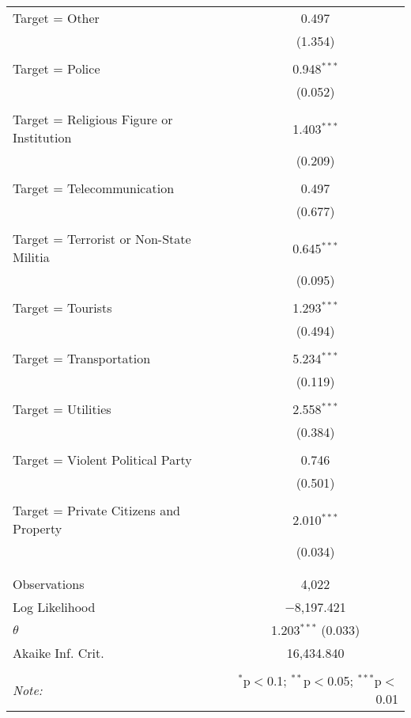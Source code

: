 \begin{table}[!htbp]
\begin{tabular}{@{\extracolsep{5pt}}lc}
 Target = Other & 0.497 \\ 
  & (1.354) \\ 
  & \\ 
 Target = Police & 0.948$^{***}$ \\ 
  & (0.052) \\ 
  & \\ 
 Target = Religious Figure or Institution & 1.403$^{***}$ \\ 
  & (0.209) \\ 
  & \\ 
 Target = Telecommunication & 0.497 \\ 
  & (0.677) \\ 
  & \\ 
 Target = Terrorist or Non-State Militia & 0.645$^{***}$ \\ 
  & (0.095) \\ 
  & \\ 
 Target = Tourists & 1.293$^{***}$ \\ 
  & (0.494) \\ 
  & \\ 
 Target = Transportation & 5.234$^{***}$ \\ 
  & (0.119) \\ 
  & \\ 
 Target = Utilities & 2.558$^{***}$ \\ 
  & (0.384) \\ 
  & \\ 
 Target = Violent Political Party & 0.746 \\ 
  & (0.501) \\ 
  & \\ 
 Target = Private Citizens and Property & 2.010$^{***}$ \\ 
  & (0.034) \\ 
  & \\ 
\hline \\[-1.8ex] 
Observations & 4,022 \\ 
Log Likelihood & $-$8,197.421 \\ 
$\theta$ & 1.203$^{***}$  (0.033) \\ 
Akaike Inf. Crit. & 16,434.840 \\ 
\hline 
\hline \\[-1.8ex] 
\textit{Note:}  & \multicolumn{1}{r}{$^{*}$p$<$0.1; $^{**}$p$<$0.05; $^{***}$p$<$0.01} \\ 
\end{tabular} 
\end{table} 
